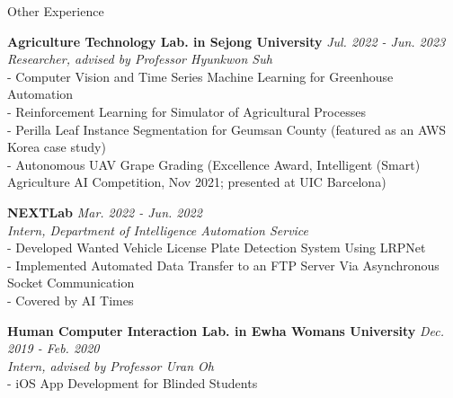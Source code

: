 \documentclass{resume} %
\begin{document}

\begin{rSection}{Other Experience}

{\bf Agriculture Technology Lab. in Sejong University} \hfill {\em Jul. 2022 - Jun. 2023}
\\ \textit {Researcher, advised by Professor Hyunkwon Suh}
\\ - Computer Vision and Time Series Machine Learning for Greenhouse Automation
\\ - Reinforcement Learning for Simulator of Agricultural Processes
\\ - Perilla Leaf Instance Segmentation for Geumsan County (featured as an AWS Korea case study)
\\ - Autonomous UAV Grape Grading (Excellence Award, Intelligent (Smart) Agriculture AI Competition, Nov 2021; presented at UIC Barcelona)

{\bf NEXTLab } \hfill {\em Mar. 2022 - Jun. 2022}
\\ \textit {Intern, Department of Intelligence Automation Service}
\\ - Developed Wanted Vehicle License Plate Detection System Using LRPNet
\\ - Implemented Automated Data Transfer to an FTP Server Via Asynchronous Socket Communication
\\ - Covered by AI Times

{\bf Human Computer Interaction Lab. in Ewha Womans University} \hfill {\em Dec. 2019 - Feb. 2020}
\\ \textit {Intern, advised by Professor Uran Oh}
\\ - iOS App Development for Blinded Students

\end{rSection}
\end{document}
